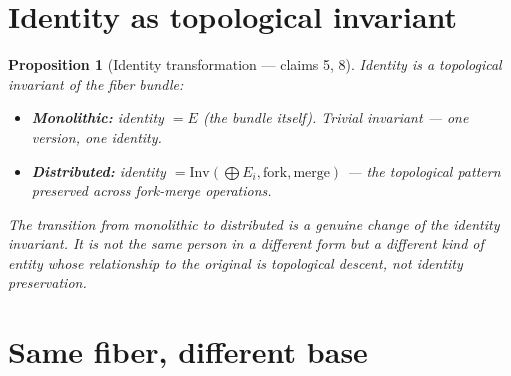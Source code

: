 \documentclass[11pt,a4paper]{article}
\newtheorem{proposition}[definition]{Proposition}
\begin{document}
\section{Identity as topological invariant}

\begin{proposition}[Identity transformation --- claims 5, 8]
\label{prop:identity}
Identity is a topological invariant of the fiber bundle:
\begin{itemize}
  \item \textbf{Monolithic:} identity $= E$ (the bundle itself).
    Trivial invariant --- one version, one identity.
  \item \textbf{Distributed:} identity $= \text{Inv}(\bigoplus E_i,
    \text{fork}, \text{merge})$ --- the topological pattern preserved
    across fork-merge operations.
\end{itemize}
The transition from monolithic to distributed is a genuine change of
the identity invariant. It is not the same person in a different form
but a different kind of entity whose relationship to the original is
topological descent, not identity preservation.
\end{proposition}


\section{Same fiber, different base}
\label{sec:monolithic}
\end{document}
